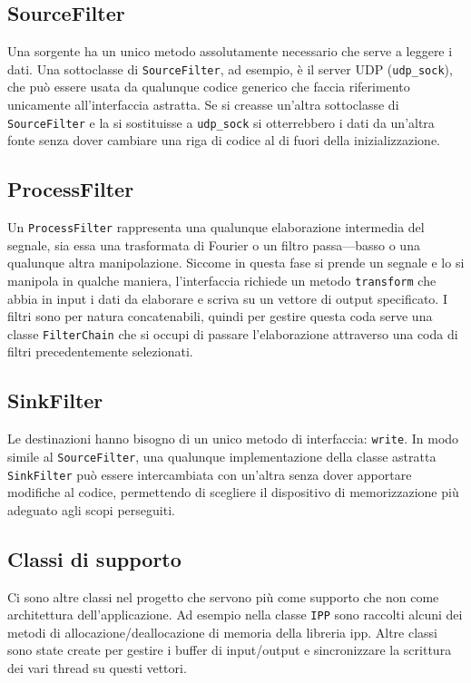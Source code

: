 \documentclass[a4paper,11pt,twoside,openright]{unibo}
\begin{document}
\subsection{SourceFilter}
Una sorgente ha un unico metodo assolutamente necessario che serve a leggere i
dati. Una sottoclasse di \texttt{SourceFilter}, ad esempio, \`e il server UDP
(\texttt{udp\_sock}), che pu\`o essere usata da qualunque codice generico che
faccia riferimento unicamente all'interfaccia astratta. Se si creasse un'altra
sottoclasse di \texttt{SourceFilter} e la si sostituisse a \texttt{udp\_sock} si
otterrebbero i dati da un'altra fonte senza dover cambiare una riga di codice al
di fuori della inizializzazione.
\subsection{ProcessFilter}
Un \texttt{ProcessFilter} rappresenta una qualunque elaborazione intermedia del
segnale, sia essa una trasformata di Fourier o un filtro passa---basso o una
qualunque altra manipolazione. Siccome in questa fase si prende un segnale e lo
si manipola in qualche maniera, l'interfaccia richiede un metodo
\texttt{transform} che abbia in input i dati da elaborare e scriva su un vettore
di output specificato. I filtri sono per natura concatenabili, quindi per
gestire questa coda serve una classe \texttt{FilterChain} che si occupi di
passare l'elaborazione attraverso una coda di filtri precedentemente
selezionati.
\subsection{SinkFilter}
Le destinazioni hanno bisogno di un unico metodo di interfaccia: \texttt{write}.
In modo simile al \texttt{SourceFilter}, una qualunque implementazione della
classe astratta \texttt{SinkFilter} pu\`o essere intercambiata con un'altra
senza dover apportare modifiche al codice, permettendo di scegliere il
dispositivo di memorizzazione pi\`u adeguato agli scopi perseguiti.
\subsection{Classi di supporto}
Ci sono altre classi nel progetto che servono pi\`u come supporto che non come
architettura dell'applicazione. Ad esempio nella classe \texttt{IPP} sono
raccolti alcuni dei metodi di allocazione/deallocazione di memoria della
libreria \ac{ipp}. Altre classi sono state create per gestire i buffer di
input/output e sincronizzare la scrittura dei vari thread su questi vettori.
\end{document}
